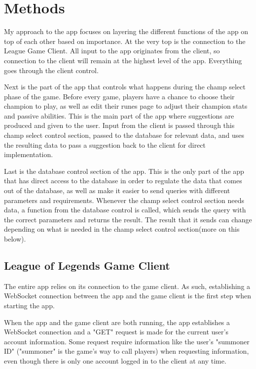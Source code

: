 \documentclass[10pt,twocolumn]{article}
\begin{document}
\section{Methods}
My approach to the app focuses on layering the different functions of the app on top of each other based on importance.
At the very top is the connection to the League Game Client.
All input to the app originates from the client, so connection to the client will remain at the highest level of the app.
Everything goes through the client control.

Next is the part of the app that controls what happens during the champ select phase of the game.
Before every game, players have a chance to choose their champion to play, as well as edit their runes page to adjust their champion stats and passive abilities.
This is the main part of the app where suggestions are produced and given to the user.
Input from the client is passed through this champ select control section, passed to the database for relevant data, and uses the resulting data to pass a suggestion back to the client for direct implementation.

Last is the database control section of the app.
This is the only part of the app that has direct access to the database in order to regulate the data that comes out of the database, as well as make it easier to send queries with different parameters and requirements.
Whenever the champ select control section needs data, a function from the database control is called, which sends the query with the correct parameters and returns the result.
The result that it sends can change depending on what is needed in the champ select control section(more on this below).

\subsection{League of Legends Game Client}
The entire app relies on its connection to the game client.
As such, establishing a WebSocket connection between the app and the game client is the first step when starting the app.

When the app and the game client are both running, the app establishes a WebSocket connection and a "GET" request is made for the current user's account information.
Some request require information like the user's "summoner ID" ("summoner" is the game's way to call players) when requesting information, even though there is only one account logged in to the client at any time.
\end{document}
